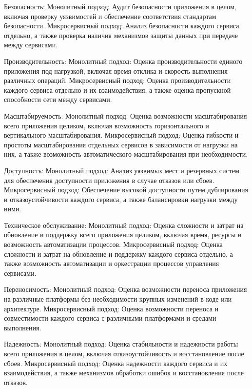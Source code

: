     Безопасность:
        Монолитный подход: Аудит безопасности приложения в целом, включая проверку уязвимостей и обеспечение соответствия стандартам безопасности.
        Микросервисный подход: Анализ безопасности каждого сервиса отдельно, а также проверка наличия механизмов защиты данных при передаче между сервисами.

    Производительность:
        Монолитный подход: Оценка производительности единого приложения под нагрузкой, включая время отклика и скорость выполнения различных операций.
        Микросервисный подход: Оценка производительности каждого сервиса отдельно и их взаимодействия, а также оценка пропускной способности сети между сервисами.

    Масштабируемость:
        Монолитный подход: Оценка возможности масштабирования всего приложения целиком, включая возможность горизонтального и вертикального масштабирования.
        Микросервисный подход: Оценка гибкости и простоты масштабирования отдельных сервисов в зависимости от нагрузки на них, а также возможность автоматического масштабирования при необходимости.

    Доступность:
        Монолитный подход: Анализ уязвимых мест и резервных систем для обеспечения доступности приложения в случае отказов или сбоев.
        Микросервисный подход: Обеспечение высокой доступности путем дублирования и отказоустойчивости каждого сервиса, а также балансировки нагрузки между ними.

    Техническое обслуживание:
        Монолитный подход: Оценка сложности и затрат на обновление и поддержку всего приложения целиком, включая время, ресурсы и возможность автоматизации процессов.
        Микросервисный подход: Оценка сложности и затрат на обновление и поддержку каждого сервиса отдельно, а также возможность автоматизации и оркестрации процессов управления сервисами.

    Переносимость:
        Монолитный подход: Оценка возможности переноса приложения на различные платформы без необходимости крупных изменений в коде или архитектуре.
        Микросервисный подход: Оценка возможности переноса и совместимости каждого сервиса с различными платформами и средами выполнения.

    Надежность:
        Монолитный подход: Оценка стабильности и надежности работы всего приложения в целом, включая отказоустойчивость и восстановление после сбоев.
        Микросервисный подход: Оценка надежности каждого сервиса и их взаимодействия, а также механизмов обработки ошибок и восстановления после отказов.

